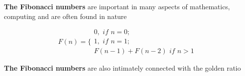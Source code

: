 \documentclass{article}
\begin{document}
\begin{landscape}

\centerline{\textbf{The Fibonacci numbers} are important in many aspects of mathematics, computing and are often found in nature}
$$ 
F(n) = \Bigg\{\begin{matrix}
		  0, \textit{ if } n = 0;  \\
		  1, \textit{ if } n = 1;  \\
		  F(n-1) + F(n-2)  \textit{ if } n > 1
		\end{matrix}
 $$
\centerline{\textbf{The Fibonacci numbers} are also intimately connected with the golden ratio}

\end{landscape}
\end{document}
